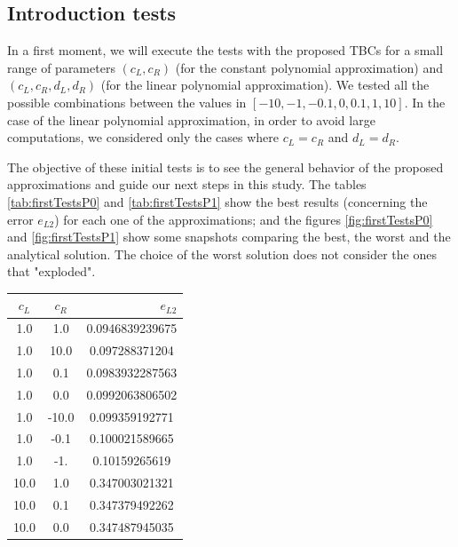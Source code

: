 \subsection{Introduction tests}

\indent In a first moment, we will execute the tests with the proposed TBCs for a small range of parameters $(c_L,c_R)$ (for the constant polynomial approximation) and $(c_L,c_R,d_L,d_R)$ (for the linear polynomial approximation).  We tested all the possible combinations between the values in $[-10,-1,-0.1,0,0.1,1,10]$. In the case of the linear polynomial approximation, in order to avoid large computations, we considered only the cases where $c_L = c_R$ and $d_L = d_R$.

\indent The objective of these initial tests is to see the general behavior of the proposed approximations and guide our next steps in this study. The tables \ref{tab:firstTestsP0} and \ref{tab:firstTestsP1} show the best results (concerning the error $e_{L2}$) for each one of the approximations; and the figures \ref{fig:firstTestsP0} and \ref{fig:firstTestsP1} show some snapshots comparing the best, the worst and the analytical solution. The choice of the worst solution does not consider the ones that "exploded".

\begin{center}
\begin{tabular}{c|c|S[round-precision=4,table-number-alignment =  left]}
	  &  &  \\
	 & 1.0 & 0.0946839239675 \\
	1.0 & 10.0 & 0.097288371204 \\
	1.0 & 0.1 & 0.0983932287563 \\
	1.0 & 0.0 & 0.0992063806502 \\
	1.0 & -10.0 & 0.099359192771 \\
	1.0 & -0.1 & 0.100021589665 \\
	1.0 &  -1. & 0.10159265619 \\
	10.0 & 1.0 & 0.347003021321 \\
	10.0 & 0.1 & 0.347379492262 \\
	10.0 & 0.0 & 0.347487945035
\end{tabular}
\end{center}


